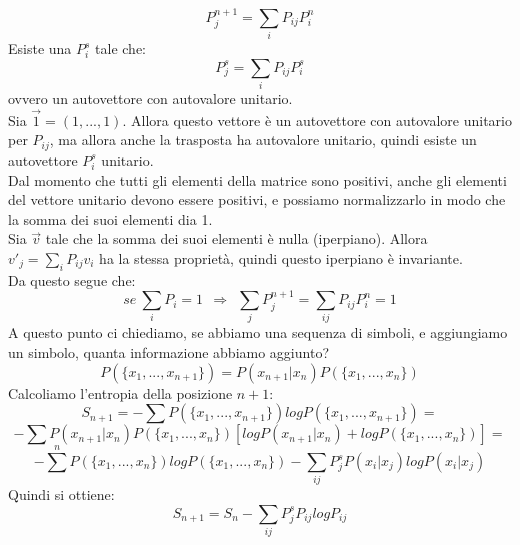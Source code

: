 \documentclass[12pt]{article}
\newcommand{\vv}{\vec{v}}
\begin{document}
$$
	P^{n+1}_j = \sum_iP_{ij}P^n_i 
$$
Esiste una $P^s_i$ tale che:
$$
	P^s_j = \sum_i P_{ij}P^s_i
$$
ovvero un autovettore con autovalore unitario. \\
Sia $\vec{1} = (1,...,1)$. Allora questo vettore è un autovettore con autovalore unitario per $P_{ij}$, ma allora anche la trasposta ha autovalore unitario, quindi esiste un autovettore $P_i^s$ unitario. \\
Dal momento che tutti gli elementi della matrice sono positivi, anche gli elementi del vettore unitario devono essere positivi, e possiamo normalizzarlo in modo che la somma dei suoi elementi dia 1. \\
Sia $\vv$ tale che la somma dei suoi elementi è nulla (iperpiano). Allora $v'_j = \sum_i P_{ij}v_i$ ha la stessa proprietà, quindi questo iperpiano è invariante. \\
Da questo segue che:
$$
	se \ \sum_iP_i = 1 \ \ \Longrightarrow \ \ \sum_j P^{n+1}_j = \sum_{ij} P_{ij} P_i^n = 1
$$ 	
A questo punto ci chiediamo, se abbiamo una sequenza di simboli, e aggiungiamo un simbolo, quanta informazione abbiamo aggiunto?
$$
	P(\{x_1,...,x_{n+1}\}) = P(x_{n+1}|x_n)P(\{x_1,...,x_n\})
$$
Calcoliamo l'entropia della posizione $n+1$:
$$
	S_{n+1} = - \sum P(\{x_1,...,x_{n+1}\}) log  P(\{x_1,...,x_{n+1}\}) = 
$$
$$
	- \sum P(x_{n+1}|x_n)P(\{x_1,...,x_n\}) \left[log P(x_{n+1}|x_n) + log P(\{x_1,...,x_n\}) \right] = 
$$
$$
	-\sum^n P(\{x_1,...,x_n\}) log P(\{x_1,...,x_n\}) - \sum_{ij} P_j^sP(x_i|x_j)logP(x_i|x_j)
$$
Quindi si ottiene:
\begin{equation}
	S_{n+1} = S_n - \sum_{ij} P_j^sP_{ij}logP_{ij}
\end{equation}
\end{document}

